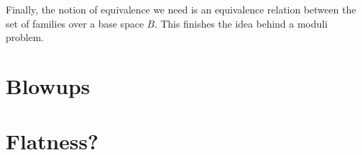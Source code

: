 Finally, the notion of equivalence we need is an equivalence relation between the set of families over a base space $B$.
This finishes the idea behind a moduli problem.


\section{Blowups}
\section{Flatness?}
